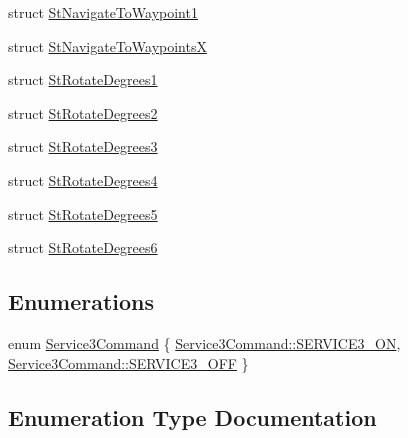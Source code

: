 \begin{DoxyCompactItemize}
\item 
struct \hyperlink{structsm__dance__bot_1_1StNavigateToWaypoint1}{St\+Navigate\+To\+Waypoint1}
\item 
struct \hyperlink{structsm__dance__bot_1_1StNavigateToWaypointsX}{St\+Navigate\+To\+WaypointsX}
\item 
struct \hyperlink{structsm__dance__bot_1_1StRotateDegrees1}{St\+Rotate\+Degrees1}
\item 
struct \hyperlink{structsm__dance__bot_1_1StRotateDegrees2}{St\+Rotate\+Degrees2}
\item 
struct \hyperlink{structsm__dance__bot_1_1StRotateDegrees3}{St\+Rotate\+Degrees3}
\item 
struct \hyperlink{structsm__dance__bot_1_1StRotateDegrees4}{St\+Rotate\+Degrees4}
\item 
struct \hyperlink{structsm__dance__bot_1_1StRotateDegrees5}{St\+Rotate\+Degrees5}
\item 
struct \hyperlink{structsm__dance__bot_1_1StRotateDegrees6}{St\+Rotate\+Degrees6}
\end{DoxyCompactItemize}
\subsection*{Enumerations}
\begin{DoxyCompactItemize}
\item 
enum \hyperlink{namespacesm__dance__bot_a2d0902aa29698165effd2c3248a9c8ff}{Service3\+Command} \{ \hyperlink{namespacesm__dance__bot_a2d0902aa29698165effd2c3248a9c8ffa13cdca48a01bbb44fa8fb35567fbc58e}{Service3\+Command\+::\+S\+E\+R\+V\+I\+C\+E3\+\_\+\+ON}, 
\hyperlink{namespacesm__dance__bot_a2d0902aa29698165effd2c3248a9c8ffa642ed22a7f6b816840289b4256116e9e}{Service3\+Command\+::\+S\+E\+R\+V\+I\+C\+E3\+\_\+\+O\+FF}
 \}
\end{DoxyCompactItemize}


\subsection{Enumeration Type Documentation}
